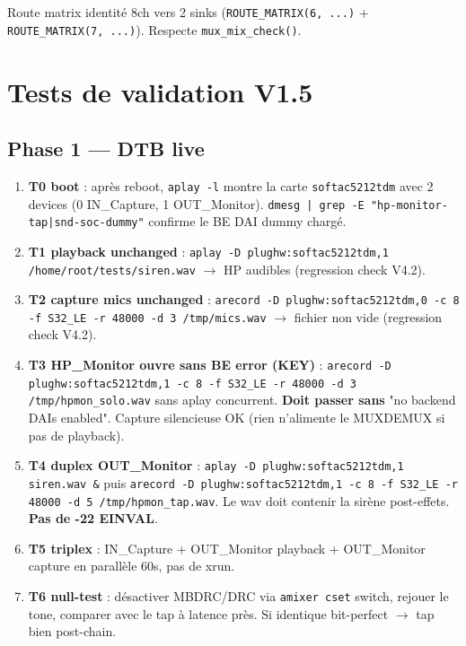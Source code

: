 \documentclass[11pt,a4paper]{article}
\begin{document}
Route matrix identité 8ch vers 2 sinks (\texttt{ROUTE\_MATRIX(6, ...)} + \texttt{ROUTE\_MATRIX(7, ...)}). Respecte \texttt{mux\_mix\_check()}.

\section{Tests de validation V1.5}

\subsection{Phase 1 — DTB live}

\begin{enumerate}[leftmargin=*, itemsep=2pt]
  \item \textbf{T0 boot} : après reboot, \texttt{aplay -l} montre la carte \texttt{softac5212tdm} avec 2 devices (0 IN\_Capture, 1 OUT\_Monitor). \texttt{dmesg | grep -E "hp-monitor-tap|snd-soc-dummy"} confirme le BE DAI dummy chargé.
  \item \textbf{T1 playback unchanged} : \texttt{aplay -D plughw:softac5212tdm,1 /home/root/tests/siren.wav} $\to$ HP audibles (regression check V4.2).
  \item \textbf{T2 capture mics unchanged} : \texttt{arecord -D plughw:softac5212tdm,0 -c 8 -f S32\_LE -r 48000 -d 3 /tmp/mics.wav} $\to$ fichier non vide (regression check V4.2).
  \item \textbf{T3 HP\_Monitor ouvre sans BE error (KEY)} : \texttt{arecord -D plughw:softac5212tdm,1 -c 8 -f S32\_LE -r 48000 -d 3 /tmp/hpmon\_solo.wav} sans aplay concurrent. \textbf{Doit passer sans} "no backend DAIs enabled". Capture silencieuse OK (rien n'alimente le MUXDEMUX si pas de playback).
  \item \textbf{T4 duplex OUT\_Monitor} : \texttt{aplay -D plughw:softac5212tdm,1 siren.wav \&} puis \texttt{arecord -D plughw:softac5212tdm,1 -c 8 -f S32\_LE -r 48000 -d 5 /tmp/hpmon\_tap.wav}. Le wav doit contenir la sirène post-effets. \textbf{Pas de -22 EINVAL}.
  \item \textbf{T5 triplex} : IN\_Capture + OUT\_Monitor playback + OUT\_Monitor capture en parallèle 60s, pas de xrun.
  \item \textbf{T6 null-test} : désactiver MBDRC/DRC via \texttt{amixer cset} switch, rejouer le tone, comparer avec le tap à latence près. Si identique bit-perfect $\to$ tap bien post-chain.
\end{enumerate}
\end{document}
